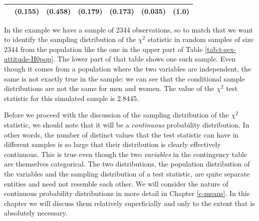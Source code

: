 \documentclass[11pt,a4paper,openany]{book}
\begin{document}
\begin{longtable}[]{@{}lcccccr@{}}
\begin{minipage}[t]{0.33\columnwidth}
\strut
\end{minipage} & \begin{minipage}[t]{0.08\columnwidth}\centering\strut
(0.155)\strut
\end{minipage} & \begin{minipage}[t]{0.07\columnwidth}\centering\strut
(0.458)\strut
\end{minipage} & \begin{minipage}[t]{0.11\columnwidth}\centering\strut
(0.179)\strut
\end{minipage} & \begin{minipage}[t]{0.08\columnwidth}\centering\strut
(0.173)\strut
\end{minipage} & \begin{minipage}[t]{0.08\columnwidth}\centering\strut
(0.035)\strut
\end{minipage} & \begin{minipage}[t]{0.05\columnwidth}\raggedleft\strut
(1.0)\strut
\end{minipage}\tabularnewline
\bottomrule
\end{longtable}

In the example we have a sample of 2344 observations, so to match that
we want to identify the sampling distribution of the \(\chi^{2}\)
statistic in random samples of size 2344 from the population like the
one in the upper part of Table \ref{tab:t-sex-attitude-H0pop}. The lower
part of that table shows one such sample. Even though it comes from a
population where the two variables are independent, the same is not
exactly true in the sample: we can see that the conditional sample
distributions are not the same for men and women. The value of the
\(\chi^{2}\) test statistic for this simulated sample is 2.8445.

Before we proceed with the discussion of the sampling distribution of
the \(\chi^{2}\) statistic, we should note that it will be a
\emph{continuous} probability distribution. In other words, the number
of distinct values that the test statistic can have in different samples
is so large that their distribution is clearly effectively continuous.
This is true even though the two \emph{variables} in the contingency
table are themselves categorical. The two distributions, the population
distribution of the variables and the sampling distribution of a test
statistic, are quite separate entities and need not resemble each other.
We will consider the nature of continuous probability distributions in
more detail in Chapter \ref{c-means}. In this chapter we will discuss
them relatively superficially and only to the extent that is absolutely
necessary.
\end{document}
